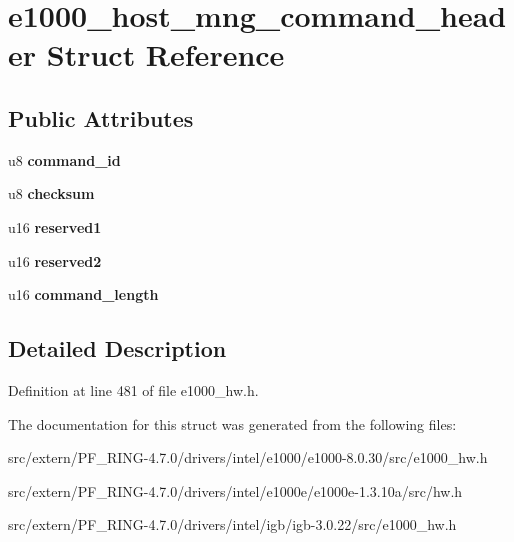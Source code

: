 \hypertarget{structe1000__host__mng__command__header}{
\section{e1000\_\-host\_\-mng\_\-command\_\-header Struct Reference}
\label{structe1000__host__mng__command__header}
}
\subsection*{Public Attributes}
\begin{DoxyCompactItemize}
\item 
\hypertarget{structe1000__host__mng__command__header_a52c07fe509ddc4febcb248a6251de682}{
u8 {\bfseries command\_\-id}}
\label{structe1000__host__mng__command__header_a52c07fe509ddc4febcb248a6251de682}

\item 
\hypertarget{structe1000__host__mng__command__header_acfb4e7d42bbf235d655b949bafb6141a}{
u8 {\bfseries checksum}}
\label{structe1000__host__mng__command__header_acfb4e7d42bbf235d655b949bafb6141a}

\item 
\hypertarget{structe1000__host__mng__command__header_ad3b51fd12e2b619f259d9ebcc5780712}{
u16 {\bfseries reserved1}}
\label{structe1000__host__mng__command__header_ad3b51fd12e2b619f259d9ebcc5780712}

\item 
\hypertarget{structe1000__host__mng__command__header_a959add53d35e3ea8f0ae4f9bab18c0c8}{
u16 {\bfseries reserved2}}
\label{structe1000__host__mng__command__header_a959add53d35e3ea8f0ae4f9bab18c0c8}

\item 
\hypertarget{structe1000__host__mng__command__header_aa4910dababb9937315d21e7143986044}{
u16 {\bfseries command\_\-length}}
\label{structe1000__host__mng__command__header_aa4910dababb9937315d21e7143986044}

\end{DoxyCompactItemize}


\subsection{Detailed Description}


Definition at line 481 of file e1000\_\-hw.h.



The documentation for this struct was generated from the following files:\begin{DoxyCompactItemize}
\item 
src/extern/PF\_\-RING-\/4.7.0/drivers/intel/e1000/e1000-\/8.0.30/src/e1000\_\-hw.h\item 
src/extern/PF\_\-RING-\/4.7.0/drivers/intel/e1000e/e1000e-\/1.3.10a/src/hw.h\item 
src/extern/PF\_\-RING-\/4.7.0/drivers/intel/igb/igb-\/3.0.22/src/e1000\_\-hw.h\end{DoxyCompactItemize}
